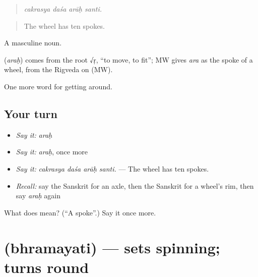 \begin{quote}
   
\end{quote}

\begin{quote}
\emph{cakrasya daśa arāḥ santi.}
\end{quote}

\begin{quote}
The wheel has ten spokes.
\end{quote}

A masculine noun.

\begin{cousinweb}
\textbf{} (\emph{araḥ}) comes from the root √ṛ, \textquotedblleft{}to move, to fit\textquotedblright{}; MW gives \emph{ara} as the spoke of a wheel, from the Rigveda on (MW).
\end{cousinweb}

\begin{grammarlens}[title={What you've built}]
One more word for getting around.
\end{grammarlens}

\subsection*{Your turn}
\begin{itemize}
\raggedright
  \item \emph{Say it:} \emph{araḥ}
  \item \emph{Say it:} \emph{araḥ}, once more
  \item \emph{Say it:} \emph{cakrasya daśa arāḥ santi.} — The wheel has ten spokes.
  \item \emph{Recall:} say the Sanskrit for an axle, then the Sanskrit for a wheel's rim, then say \emph{araḥ} again
\end{itemize}

\begin{tcolorbox}[breakable,colback=teal!4,colframe=teal!35!black,title={Before you move on}]
What does  mean? (\textquotedblleft{}A spoke\textquotedblright{}.) Say it once more.
\end{tcolorbox}
\section[\texorpdfstring{\sk{भ्रमयति} (bhramayati)}{भ्रमयति (bhramayati)}]{ (bhramayati) — sets spinning; turns round}

\label{lesson:SA-C409-bhramayati}




